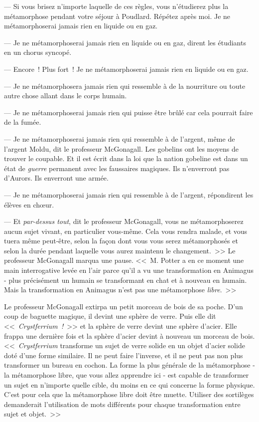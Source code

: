 --- Si vous brisez n'importe laquelle de ces règles, vous n'étudierez plus la métamorphose pendant votre séjour à Poudlard. Répétez après moi. Je ne métamorphoserai jamais rien en liquide ou en gaz.

--- Je ne métamorphoserai jamais rien en liquide ou en gaz, dirent les étudiants en un chorus syncopé.

--- Encore~! Plus fort~! Je ne métamorphoserai jamais rien en liquide ou en gaz.

--- Je ne métamorphosera jamais rien qui ressemble à de la nourriture ou toute autre chose allant dans le corps humain.

--- Je ne métamorphoserai jamais rien qui puisse être brûlé car cela pourrait faire de la fumée.

--- Je ne métamorphoserai jamais rien qui ressemble à de l'argent, même de l'argent Moldu, dit le professeur McGonagall. Les gobelins ont les moyens de trouver le coupable. Et il est écrit dans la loi que la nation gobeline est dans un état de \emph{guerre} permanent avec les faussaires magiques. Ils n'enverront pas d'Aurors. Ils enverront une armée.

--- Je ne métamorphoserai jamais rien qui ressemble à de l'argent, répondirent les élèves en chœur.

--- Et \emph{par-dessus tout}, dit le professeur McGonagall, vous ne métamorphoserez aucun sujet vivant, en particulier vous-même. Cela vous rendra malade, et vous tuera même peut-être, selon la façon dont vous vous serez métamorphosés et selon la durée pendant laquelle vous aurez maintenu le changement.~>> Le professeur McGonagall marqua une pause. <<~M. Potter a en ce moment une main interrogative levée en l'air parce qu'il a vu une transformation en Animagus - plus précisément un humain se transformant en chat et à nouveau en humain. Mais la transformation en Animagus n'est pas une métamorphose \emph{libre}.~>>

Le professeur McGonagall extirpa un petit morceau de bois de sa poche. D'un coup de baguette magique, il devint une sphère de verre. Puis elle dit <<~\emph{Crystferrium~!}~>> et la sphère de verre devint une sphère d'acier. Elle frappa une dernière fois et la sphère d'acier devint à nouveau un morceau de bois. <<~\emph{Crystferrium} transforme un sujet de verre solide en un objet d'acier solide doté d'une forme similaire. Il ne peut faire l'inverse, et il ne peut pas non plus transformer un bureau en cochon. La forme la plus générale de la métamorphose - la métamorphose libre, que vous allez apprendre ici - est capable de transformer un sujet en n'importe quelle cible, du moins en ce qui concerne la forme physique. C'est pour cela que la métamorphose libre doit être muette. Utiliser des sortilèges demanderait l'utilisation de mots différents pour chaque transformation entre sujet et objet.~>>

